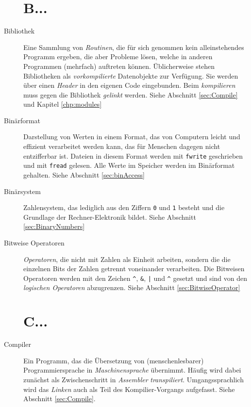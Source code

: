 \begin{appendices}
\begin{description}
\section*{B...}
\item[Bibliothek] Eine Sammlung von \emph{Routinen}, die für sich genommen kein alleinstehendes Programm
	ergeben, die aber Probleme lösen, welche in anderen Programmen (mehrfach) auftreten können.
	Üblicherweise stehen Bibliotheken als \emph{vorkompilierte} Datenobjekte zur Verfügung. Sie werden
	über einen \emph{Header} in den eigenen Code eingebunden. Beim \emph{kompilieren} muss gegen die
	Bibliothek \emph{gelinkt} werden.\newline
	Siehe Abschnitt \ref{sec:Compile} und Kapitel \ref{chp:modules}
\item[Binärformat] Darstellung von Werten in einem Format, das von Computern leicht und effizient
	verarbeitet werden kann, das für Menschen dagegen \idR nicht entzifferbar ist. Dateien in diesem
	Format werden mit \texttt{fwrite} geschrieben und mit \texttt{fread} gelesen. Alle Werte im Speicher
	werden im Binärformat gehalten.\newline
	Siehe Abschnitt \ref{sec:binAccess}
\item[Binärsystem] Zahlensystem, das lediglich aus den Ziffern \texttt{0} und \texttt{1} besteht und die
	Grundlage der Rechner-Elektronik bildet. \newline
	Siehe Abschnitt \ref{sec:BinaryNumbers}
\item[Bitweise Operatoren] \emph{Operatoren}, die nicht mit Zahlen als Einheit arbeiten, sondern die die
	einzelnen Bits der Zahlen getrennt voneinander verarbeiten. Die Bitweisen Operatoren werden
	mit den Zeichen \texttt{\textasciicircum}, \texttt{\&}, \texttt{|} und \texttt{\^} gesetzt und sind
	von den \emph{logischen Operatoren} abzugrenzen.\newline
	Siehe Abschnitt \ref{sec:BitwiseOperator}

\section*{C...}
\item[Compiler] Ein Programm, das die Übersetzung von (menschenlesbarer) Programmiersprache in
	\emph{Maschinensprache} übernimmt. Häufig wird dabei zunächst als Zwischenschritt in
	\emph{Assembler} \emph{transpiliert}.\newline
	Umgangssprachlich wird das \emph{Linken} auch als Teil des Kompilier-Vorgangs aufgefasst.\newline
	Siehe Abschnitt \ref{sec:Compile}.
	

\end{description}
\end{appendices}
